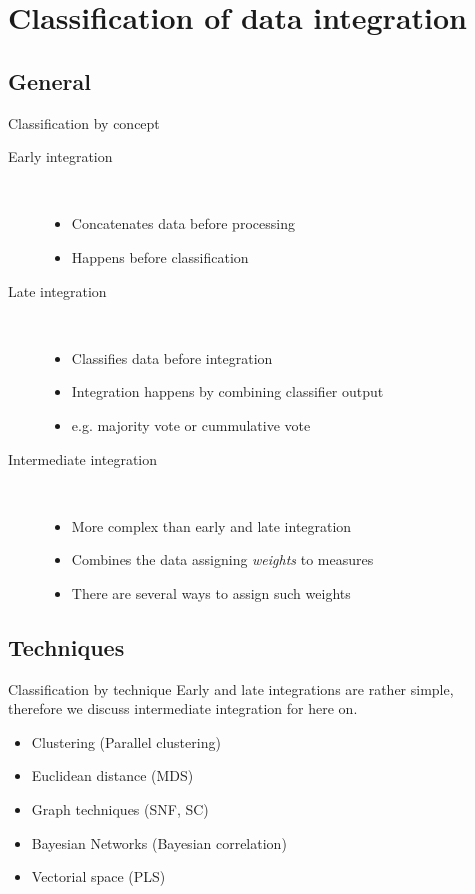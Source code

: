 \documentclass[hyperref={colorlinks=true}]{beamer}
\begin{document}
\section{Classification of data integration}

\subsection{General}
\begin{frame}{Classification by concept}
  \begin{description}
    \item[Early integration] \hfill \\
    \pause
    \begin{itemize}
      \item Concatenates data before processing
      \item Happens before classification
    \end{itemize}
    \pause
    \item[Late integration] \hfill \\
    \pause
    \begin{itemize}
      \item Classifies data before integration
      \item Integration happens by combining classifier output
      \item e.g. majority vote or cummulative vote
    \end{itemize}
    \pause
    \item[Intermediate integration] \hfill \\
    \pause
    \begin{itemize}
      \item More complex than early and late integration
      \item Combines the data assigning \emph{weights} to measures
      \item There are several ways to assign such weights
    \end{itemize}
  \end{description}
\end{frame}

\subsection{Techniques}
\begin{frame}{Classification by technique}
  Early and late integrations are rather simple, therefore we discuss
  intermediate integration for here on.
  \pause
  \begin{itemize}
    \item Clustering (Parallel clustering)
    \item Euclidean distance (MDS)
    \item Graph techniques (SNF, SC)
    \item Bayesian Networks (Bayesian correlation)
    \item Vectorial space (PLS)
  \end{itemize}
\end{frame}
\end{document}
